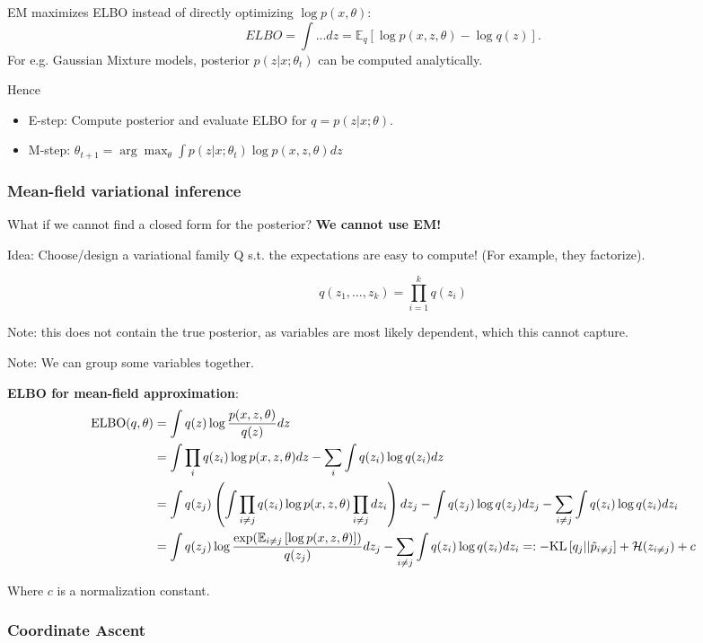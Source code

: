 \documentclass{article}
\newcommand{\E}[2]{\mathbb{E}_{#1}\left[#2\right]}
\newcommand{\mc}[1]{\mathcal{#1}}
\newcommand{\KL}[2]{\mathrm{KL}\left[#1||#2\right]}
\begin{document}
EM maximizes ELBO instead of directly optimizing $\log p(x, \theta)$:
$$ELBO = \int ... dz = \E{q}{\log p(x, z, \theta) - \log q(z)}.$$
For e.g. Gaussian Mixture models, posterior $p(z|x; \theta_t)$ can be computed analytically.

Hence
\begin{itemize}
    \item E-step: Compute posterior and evaluate ELBO for $q = p(z|x; \theta)$.
    \item M-step: $\theta_{t+1} = \arg\max_\theta \int p(z|x; \theta_t) \log p(x, z, \theta) dz$
\end{itemize}

\subsubsection{Mean-field variational inference}

What if we cannot find a closed form for the posterior? \textbf{We cannot use EM!}

Idea: Choose/design a variational family Q s.t. the expectations are easy to compute! (For example, they factorize).

$$q(z_1, \ldots, z_k) = \prod_{i=1}^k q(z_i)$$

Note: this does not contain the true posterior, as variables are most likely dependent, which this cannot capture.

Note: We can group some variables together.

\textbf{ELBO for mean-field approximation}:
\begin{align*}
\mathrm{ELBO}(q, \theta) &= \int q(z) \log \frac{p(x, z, \theta)}{q(z)} dz\\
&= \int \prod_i q(z_i) \log p(x, z, \theta) dz - \sum_i \int q(z_i) \log q(z_i)dz\\
&= \int q(z_j) \left(\int \prod_{i \neq j} q(z_i) \log p(x, z, \theta) \prod_{i \neq j} dz_i \right)dz_j - \int q(z_j) \log q(z_j) dz_j - \sum_{i \neq j} \int q(z_i) \log q(z_i) dz_i\\
&= \int q(z_j) \log \frac{\exp(\E{i \neq j}{\log p(x, z, \theta)})}{q(z_j)} dz_j
- \sum_{i \neq j} \int q(z_i) \log q(z_i) dz_i =: -\KL{q_j}{\Tilde{p}_{i \neq j}} + \mc{H}(z_{i \neq j}) + c
\end{align*}

Where $c$ is a normalization constant.

\subsubsection{Coordinate Ascent}
\end{document}
